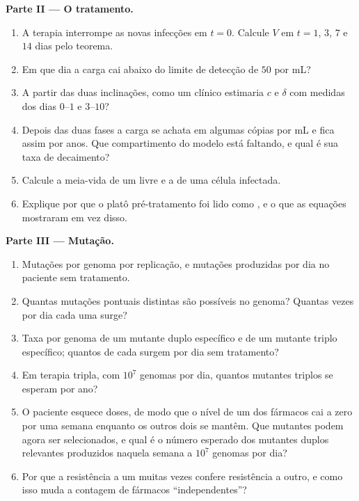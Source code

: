 \begin{problem}
\medskip
\noindent\textbf{Parte II --- O tratamento.}
\begin{enumerate}[resume]
  \item A terapia interrompe as novas infecções em $t = 0$. Calcule $V$
        em $t =
        1$, $3$, $7$ e $14$ dias pelo teorema.
  \item Em que dia a carga cai abaixo do limite de detecção de $50$ por
        mL?
  \item A partir das duas inclinações, como um clínico estimaria $c$ e
        $\delta$ com medidas dos dias $0$--$1$ e $3$--$10$?
  \item Depois das duas fases a carga se achata em algumas cópias por
        mL e fica assim por anos. Que compartimento do modelo está
        faltando, e qual é sua taxa de decaimento?
  \item Calcule a meia-vida de um  livre e a de uma célula
        infectada.
  \item Explique por que o platô pré-tratamento foi lido como ,
        e o que as equações mostraram em vez disso.
\end{enumerate}

\medskip
\noindent\textbf{Parte III --- Mutação.}
\begin{enumerate}[resume]
  \item Mutações por genoma por replicação, e mutações produzidas por
        dia no paciente sem tratamento.
  \item Quantas mutações pontuais distintas são possíveis no genoma?
        Quantas vezes por dia cada uma surge?
  \item Taxa por genoma de um mutante duplo específico e de um mutante
        triplo específico; quantos de cada surgem por dia sem
        tratamento?
  \item Em terapia tripla, com $10^{7}$ genomas por dia, quantos
        mutantes triplos se esperam por ano?
  \item O paciente esquece doses, de modo que o nível de um dos
        fármacos cai a zero por uma semana enquanto os outros dois se
        mantêm. Que mutantes podem agora ser selecionados, e qual é o
        número esperado dos mutantes duplos relevantes produzidos
        naquela semana a $10^{7}$ genomas por dia?
  \item Por que a resistência a um  muitas vezes
        confere resistência a outro, e como isso muda a contagem de
        fármacos ``independentes''?
\end{enumerate}


\end{problem}
